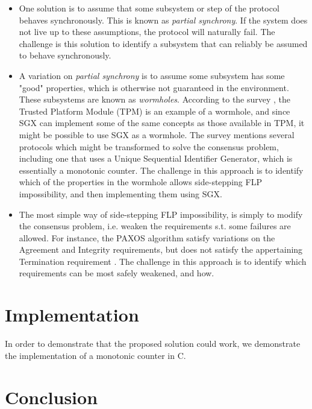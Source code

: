 \documentclass{article}
\newcommand\cpp{C\nolinebreak[4]\hspace{-.05em}\raisebox{.4ex}{\relsize{-3}{\textbf{++}}}}
\begin{document}
		\begin{itemize}
			\item One solution is to assume that some subsystem or step of the protocol behaves synchronously. This is known as \textit{partial synchrony}. If the system does not live up to these assumptions, the protocol will naturally fail. The challenge is this solution to identify a subsystem that can reliably be assumed to behave synchronously. 
			\item A variation on \textit{partial synchrony} is to assume some subsystem has some "good" properties, which is otherwise not guaranteed in the environment. These subsystems are known as \textit{wormholes}. According to the survey \cite{consensus-survey}, the Trusted Platform Module (TPM) is an example of a wormhole, and since SGX can implement some of the same concepts as those available in TPM, it might be possible to use SGX as a wormhole. The survey mentions several protocols which might be transformed to solve the consensus problem, including one that uses a Unique Sequential Identifier Generator, which is essentially a monotonic counter. The challenge in this approach is to identify which of the properties in the wormhole allows side-stepping FLP impossibility, and then implementing them using SGX.
			\item The most simple way of side-stepping FLP impossibility, is simply to modify the consensus problem, i.e. weaken the requirements s.t. some failures are allowed. For instance, the PAXOS algorithm \cite{paxos} satisfy variations on the Agreement and Integrity requirements, but does not satisfy the appertaining Termination requirement \cite{fast-byz-cons}. The challenge in this approach is to identify which requirements can be most safely weakened, and how.
		\end{itemize}
		
	\section{Implementation}

	In order to demonstrate that the proposed solution could work, we demonstrate the implementation of a monotonic counter in \cpp.

	\section{Conclusion}
\end{document}
